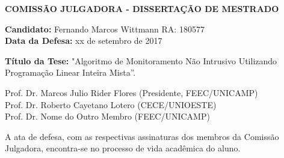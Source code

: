 \newpage

\begin{center}
  \large{\textbf{COMISSÃO JULGADORA - DISSERTAÇÃO DE MESTRADO}}
\end{center}


{\setlength{\parindent}{0cm}

\vspace{2cm}


\textbf{Candidato:} Fernando Marcos Wittmann RA: 180577 \\
\textbf{Data da Defesa:} xx de setembro de 2017

\vspace{2cm}

\textbf{Título da Tese:} "Algoritmo de Monitoramento Não Intrusivo Utilizando Programação Linear Inteira Mista”.

\vspace{3cm}

Prof. Dr. Marcos Julio Rider Flores (Presidente, FEEC/UNICAMP)\\
Prof. Dr. Roberto Cayetano Lotero (CECE/UNIOESTE)\\
Prof. Dr. Nome do Outro Membro (FEEC/UNICAMP)\\

\vspace{3cm}

 A ata de defesa, com as respectivas assinaturas dos membros da Comissão Julgadora, encontra-se no processo de vida acadêmica do aluno.
 
}